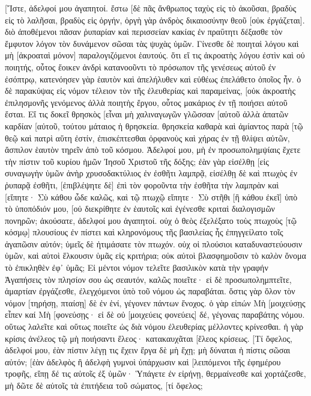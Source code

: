 [Ἴστε, ἀδελφοί μου ἀγαπητοί. ἔστω [δὲ πᾶς ἄνθρωπος ταχὺς εἰς τὸ ἀκοῦσαι, βραδὺς εἰς τὸ λαλῆσαι, βραδὺς εἰς ὀργήν, 
ὀργὴ γὰρ ἀνδρὸς δικαιοσύνην θεοῦ [οὐκ ἐργάζεται]. 
διὸ ἀποθέμενοι πᾶσαν ῥυπαρίαν καὶ περισσείαν κακίας ἐν πραΰτητι δέξασθε τὸν ἔμφυτον λόγον τὸν δυνάμενον σῶσαι τὰς ψυχὰς ὑμῶν. 
Γίνεσθε δὲ ποιηταὶ λόγου καὶ μὴ [ἀκροαταὶ μόνον] παραλογιζόμενοι ἑαυτούς. 
ὅτι εἴ τις ἀκροατὴς λόγου ἐστὶν καὶ οὐ ποιητής, οὗτος ἔοικεν ἀνδρὶ κατανοοῦντι τὸ πρόσωπον τῆς γενέσεως αὐτοῦ ἐν ἐσόπτρῳ, 
κατενόησεν γὰρ ἑαυτὸν καὶ ἀπελήλυθεν καὶ εὐθέως ἐπελάθετο ὁποῖος ἦν. 
ὁ δὲ παρακύψας εἰς νόμον τέλειον τὸν τῆς ἐλευθερίας καὶ παραμείνας, [οὐκ ἀκροατὴς ἐπιλησμονῆς γενόμενος ἀλλὰ ποιητὴς ἔργου, οὗτος μακάριος ἐν τῇ ποιήσει αὐτοῦ ἔσται. 
Εἴ τις δοκεῖ θρησκὸς [εἶναι μὴ χαλιναγωγῶν γλῶσσαν [αὐτοῦ ἀλλὰ ἀπατῶν καρδίαν [αὐτοῦ, τούτου μάταιος ἡ θρησκεία. 
θρησκεία καθαρὰ καὶ ἀμίαντος παρὰ [τῷ θεῷ καὶ πατρὶ αὕτη ἐστίν, ἐπισκέπτεσθαι ὀρφανοὺς καὶ χήρας ἐν τῇ θλίψει αὐτῶν, ἄσπιλον ἑαυτὸν τηρεῖν ἀπὸ τοῦ κόσμου. 
Ἀδελφοί μου, μὴ ἐν προσωπολημψίαις ἔχετε τὴν πίστιν τοῦ κυρίου ἡμῶν Ἰησοῦ Χριστοῦ τῆς δόξης; 
ἐὰν γὰρ εἰσέλθῃ [εἰς συναγωγὴν ὑμῶν ἀνὴρ χρυσοδακτύλιος ἐν ἐσθῆτι λαμπρᾷ, εἰσέλθῃ δὲ καὶ πτωχὸς ἐν ῥυπαρᾷ ἐσθῆτι, 
[ἐπιβλέψητε δὲ] ἐπὶ τὸν φοροῦντα τὴν ἐσθῆτα τὴν λαμπρὰν καὶ [εἴπητε· Σὺ κάθου ὧδε καλῶς, καὶ τῷ πτωχῷ εἴπητε· Σὺ στῆθι [ἢ κάθου ἐκεῖ] ὑπὸ τὸ ὑποπόδιόν μου, 
[οὐ διεκρίθητε ἐν ἑαυτοῖς καὶ ἐγένεσθε κριταὶ διαλογισμῶν πονηρῶν; 
ἀκούσατε, ἀδελφοί μου ἀγαπητοί. οὐχ ὁ θεὸς ἐξελέξατο τοὺς πτωχοὺς [τῷ κόσμῳ] πλουσίους ἐν πίστει καὶ κληρονόμους τῆς βασιλείας ἧς ἐπηγγείλατο τοῖς ἀγαπῶσιν αὐτόν; 
ὑμεῖς δὲ ἠτιμάσατε τὸν πτωχόν. οὐχ οἱ πλούσιοι καταδυναστεύουσιν ὑμῶν, καὶ αὐτοὶ ἕλκουσιν ὑμᾶς εἰς κριτήρια; 
οὐκ αὐτοὶ βλασφημοῦσιν τὸ καλὸν ὄνομα τὸ ἐπικληθὲν ἐφ᾽ ὑμᾶς; 
Εἰ μέντοι νόμον τελεῖτε βασιλικὸν κατὰ τὴν γραφήν Ἀγαπήσεις τὸν πλησίον σου ὡς σεαυτόν, καλῶς ποιεῖτε· 
εἰ δὲ προσωπολημπτεῖτε, ἁμαρτίαν ἐργάζεσθε, ἐλεγχόμενοι ὑπὸ τοῦ νόμου ὡς παραβάται. 
ὅστις γὰρ ὅλον τὸν νόμον [τηρήσῃ, πταίσῃ] δὲ ἐν ἑνί, γέγονεν πάντων ἔνοχος. 
ὁ γὰρ εἰπών Μὴ [μοιχεύσῃς εἶπεν καί Μὴ [φονεύσῃς· εἰ δὲ οὐ [μοιχεύεις φονεύεις] δέ, γέγονας παραβάτης νόμου. 
οὕτως λαλεῖτε καὶ οὕτως ποιεῖτε ὡς διὰ νόμου ἐλευθερίας μέλλοντες κρίνεσθαι. 
ἡ γὰρ κρίσις ἀνέλεος τῷ μὴ ποιήσαντι ἔλεος· κατακαυχᾶται [ἔλεος κρίσεως. 
[Τί ὄφελος, ἀδελφοί μου, ἐὰν πίστιν λέγῃ τις ἔχειν ἔργα δὲ μὴ ἔχῃ; μὴ δύναται ἡ πίστις σῶσαι αὐτόν; 
[ἐὰν ἀδελφὸς ἢ ἀδελφὴ γυμνοὶ ὑπάρχωσιν καὶ [λειπόμενοι τῆς ἐφημέρου τροφῆς, 
εἴπῃ δέ τις αὐτοῖς ἐξ ὑμῶν· Ὑπάγετε ἐν εἰρήνῃ, θερμαίνεσθε καὶ χορτάζεσθε, μὴ δῶτε δὲ αὐτοῖς τὰ ἐπιτήδεια τοῦ σώματος, [τί ὄφελος; 
